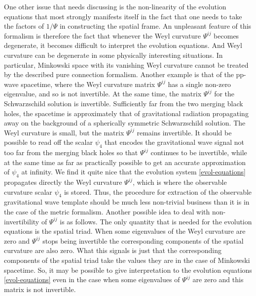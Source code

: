 \documentclass[10pt]{report}
\theoremstyle{definition}
\begin{document}
One other issue that needs discussing is the non-linearity of the evolution equations that most strongly manifests itself in the fact that one needs to take the factors of $1/\Psi$ in constructing the spatial frame. An unpleasant feature of this formalism is therefore the fact that whenever the Weyl curvature $\Psi^{ij}$ becomes degenerate, it becomes difficult to interpret the evolution equations. And Weyl curvature can be degenerate in some physically interesting situations. In particular, Minkowski space with its vanishing Weyl curvature cannot be treated by the described pure connection formalism. Another example is that of the pp-wave spacetime, where the Weyl curvature matrix $\Psi^{ij}$  has a single non-zero eigenvalue, and so is not invertible. At the same time, the matrix $\Psi^{ij}$ for the Schwarzschild solution is invertible. Sufficiently far from the two merging black holes, the spacetime is approximately that of gravitational radiation propagating away on the background of a spherically symmetric Schwarzschild solution. The Weyl curvature is small, but the matrix $\Psi^{ij}$ remains invertible. It should be possible to read off the scalar $\psi_4$ that encodes the gravitational wave signal not too far from the merging black holes so that $\Psi^{ij}$ continues to be invertible, while at the same time as far as practically possible to get an accurate approximation of $\psi_4$ at infinity. We find it quite nice that the evolution system \cref{evol-equations} propagates directly the Weyl curvature $\Psi^{ij}$, which is where the observable curvature scalar $\psi_4$ is stored. Thus, the procedure for extraction of the observable gravitational wave template should be much less non-trivial business than it is in the case of the metric formalism. Another possible idea to deal with non-invertibility of $\Psi^{ij}$ is as follows. The only quantity that is needed for the evolution equations is the spatial triad. When some eigenvalues of the Weyl curvature are zero and $\Psi^{ij}$ stops being invertible the corresponding components of the spatial curvature are also zero. What this signals is just that the corresponding components of the spatial triad take the values they are in the case of Minkowski spacetime. So, it may be possible to give interpretation to the evolution equations \cref{evol-equations} even in the case when some eigenvalues of $\Psi^{ij}$ are zero and this matrix is not invertible.
\end{document}
